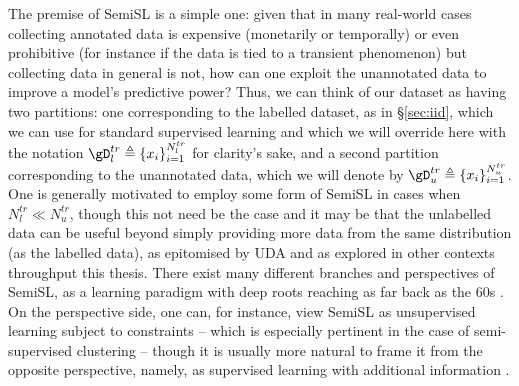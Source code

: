 The premise of SemiSL is a simple one: given that in many real-world cases collecting annotated
data is expensive (monetarily or temporally) or even prohibitive (for instance if the data is tied
to a transient phenomenon) but collecting data in general is not, how can one exploit the
unannotated data to improve a model's predictive power?
%
Thus, we can think of our dataset as having two partitions: one corresponding to the labelled
dataset, as in \S\ref{sec:iid}, which we can use for standard supervised learning and which we will
override here with the notation \( \gD^{tr}_l \triangleq \{ x_i \}_{i=1}^{N^{tr}_l} \) for
clarity's sake, and a second partition corresponding to the unannotated data, which we will denote
by \( \gD^{tr}_u  \triangleq \{ x_i \}_{i=1}^{N^{tr}_u} \).
%
One is generally motivated to employ some form of SemiSL in cases when \( N^{tr}_l \ll N^{tr}_u \),
though this not need be the case and it may be that the unlabelled data can be useful beyond simply
providing more data from the same distribution (as the labelled data), as epitomised by UDA and as
explored in other contexts throughput this thesis.
%
There exist many different branches and perspectives of SemiSL, as a learning paradigm with deep
roots reaching as far back as the 60s \citep{scudder1965probability, fralick1967learning}. 
%
On the perspective side, one can, for instance, view SemiSL as unsupervised learning subject to
constraints -- which is especially pertinent in the case of semi-supervised clustering
\citep{bair2013semi} -- though it is usually more natural to frame it from the opposite
perspective, namely, as supervised learning with additional information \citep{chapelle2009semi}.

